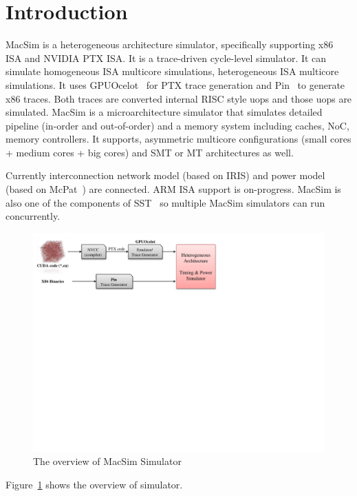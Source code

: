 
\section{Introduction}

MacSim is a heterogeneous architecture simulator, specifically
supporting x86 ISA and NVIDIA PTX ISA. It is a trace-driven
cycle-level simulator.  It can simulate homogeneous ISA multicore
simulations, heterogeneous ISA multicore simulations. It uses
GPUOcelot~\cite{ocelot} for PTX trace generation and Pin~\cite{pin} to
generate x86 traces. Both traces are converted internal RISC style
uops and those uops are simulated. MacSim is a microarchitecture
simulator that simulates detailed pipeline (in-order and out-of-order)
and a memory system including caches, NoC, memory controllers. It
supports, asymmetric multicore configurations (small cores + medium
cores + big cores) and SMT or MT architectures as well.

Currently interconnection network model (based on IRIS) and power
model (based on McPat~\cite{mcpat}) are connected. ARM ISA support is
on-progress. MacSim is also one of the components of SST~\cite{sst} so
multiple MacSim simulators can run concurrently.

\begin{figure}[htb]
\centering
\includegraphics{figs/macsim_overview}
\caption{The overview of MacSim Simulator}
\label{fig:overview}
\end{figure}

Figure~\ref{fig:overview} shows the overview of \SIM simulator.


